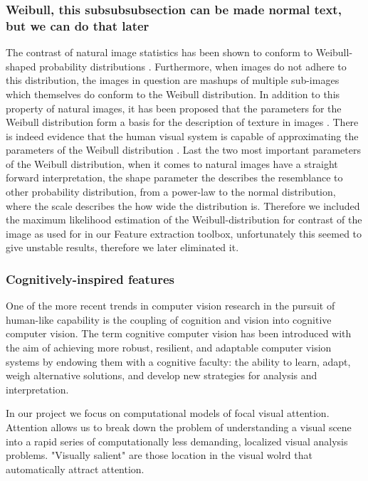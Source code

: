 \subsubsection{Weibull, this subsubsubsection can be made normal text, but we can do that later}
The contrast of natural image statistics has been shown to conform to Weibull-shaped probability distributions \cite{Weibull_physical}. Furthermore, when images do not adhere to this distribution, the images in question are mashups of multiple sub-images which themselves do conform to the Weibull distribution. In addition to this property of natural images, it has been proposed that the parameters for the Weibull distribution form a basis for the description of texture in images \cite{Weibull_6}. There is indeed evidence that the human visual system is capable of approximating the parameters of the Weibull distribution \cite{Weibull_brain}. Last the two most important parameters of the Weibull distribution, when it comes to natural images have a straight forward interpretation, the shape parameter the describes the resemblance to other probability distribution, from a power-law to the normal distribution, where the scale describes the how wide the distribution is. Therefore we included the maximum likelihood estimation of the Weibull-distribution for contrast of the image as used for \cite{Weibull_6} in our Feature extraction toolbox, unfortunately this seemed to give unstable results, therefore we later eliminated it. 

\subsubsection{Cognitively-inspired features}
One of the more recent trends in computer vision research in the pursuit of human-like capability is the coupling of cognition and vision into cognitive computer vision. 
The term cognitive computer vision has been introduced with the aim of achieving more robust, resilient, and adaptable computer vision systems by endowing them with a cognitive faculty: the ability to learn, adapt, weigh alternative solutions, and develop new strategies for analysis and interpretation.

In our project we focus on computational models of focal visual attention. Attention allows us to break down the problem of understanding a visual scene into a rapid series of computationally less demanding, localized visual analysis problems. 
"Visually salient" are those location in the visual wolrd that automatically attract attention.

